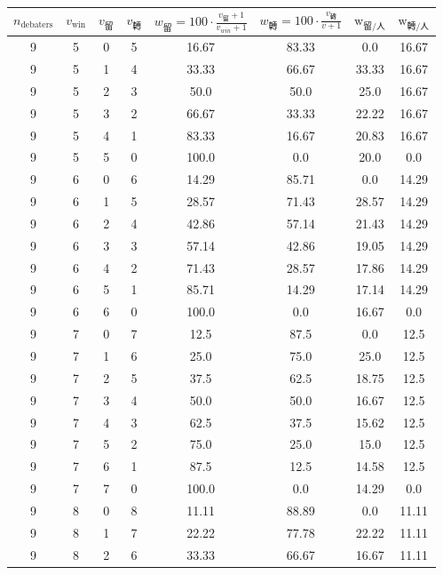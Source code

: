 \documentclass[9pt]{article}
\begin{document}
\begin{table}[h]
    \centering
    \small
    \begin{threeparttable}
    \begin{tabular}{cccccccc}
    \toprule
    $n_{\text{debaters}}$ & $v_{\text{win}}$ & $v_{\text{留}}$ & $v_{\text{轉}}$ & $w_{\text{留}} = 100 \cdot \frac{v_{\text{留}}+1}{v_{win}+1} $ & $w_{\text{轉}} = 100\cdot\frac{v_{\text{轉}}}{v+1}$ & $\text{w}_{\text{留}/\text{人} }$ & $\text{w}_{\text{轉}/\text{人}}$ \\
    \midrule
9 & 5 & 0 & 5 & 16.67 & 83.33 & 0.0 & 16.67 \\
9 & 5 & 1 & 4 & 33.33 & 66.67 & 33.33 & 16.67 \\
9 & 5 & 2 & 3 & 50.0 & 50.0 & 25.0 & 16.67 \\
9 & 5 & 3 & 2 & 66.67 & 33.33 & 22.22 & 16.67 \\
9 & 5 & 4 & 1 & 83.33 & 16.67 & 20.83 & 16.67 \\
9 & 5 & 5 & 0 & 100.0 & 0.0 & 20.0 & 0.0 \\
9 & 6 & 0 & 6 & 14.29 & 85.71 & 0.0 & 14.29 \\
9 & 6 & 1 & 5 & 28.57 & 71.43 & 28.57 & 14.29 \\
9 & 6 & 2 & 4 & 42.86 & 57.14 & 21.43 & 14.29 \\
9 & 6 & 3 & 3 & 57.14 & 42.86 & 19.05 & 14.29 \\
9 & 6 & 4 & 2 & 71.43 & 28.57 & 17.86 & 14.29 \\
9 & 6 & 5 & 1 & 85.71 & 14.29 & 17.14 & 14.29 \\
9 & 6 & 6 & 0 & 100.0 & 0.0 & 16.67 & 0.0 \\
9 & 7 & 0 & 7 & 12.5 & 87.5 & 0.0 & 12.5 \\
9 & 7 & 1 & 6 & 25.0 & 75.0 & 25.0 & 12.5 \\
9 & 7 & 2 & 5 & 37.5 & 62.5 & 18.75 & 12.5 \\
9 & 7 & 3 & 4 & 50.0 & 50.0 & 16.67 & 12.5 \\
9 & 7 & 4 & 3 & 62.5 & 37.5 & 15.62 & 12.5 \\
9 & 7 & 5 & 2 & 75.0 & 25.0 & 15.0 & 12.5 \\
9 & 7 & 6 & 1 & 87.5 & 12.5 & 14.58 & 12.5 \\
9 & 7 & 7 & 0 & 100.0 & 0.0 & 14.29 & 0.0 \\
9 & 8 & 0 & 8 & 11.11 & 88.89 & 0.0 & 11.11 \\
9 & 8 & 1 & 7 & 22.22 & 77.78 & 22.22 & 11.11 \\
9 & 8 & 2 & 6 & 33.33 & 66.67 & 16.67 & 11.11 \\

\end{tabular}
\end{threeparttable}
\end{table}
\end{document}
